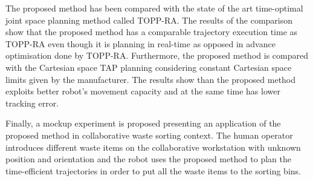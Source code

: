 The proposed method has been compared with the state of the art time-optimal joint space planning method called TOPP-RA. The results of the comparison show that the proposed method has a comparable trajectory execution time as TOPP-RA even though it is planning in real-time as opposed in advance optimisation done by TOPP-RA.
Furthermore, the proposed method is compared with the Cartesian space TAP planning considering constant Cartesian space limits given by the manufacturer. The results show than the proposed method exploits better robot's movement capacity and at the same time has lower tracking error. 

Finally, a mockup experiment is proposed presenting an application of the proposed method in collaborative waste sorting context. The human operator introduces different waste items on the collaborative workstation with unknown position and orientation and the robot uses the proposed method to plan the time-efficient trajectories in order to put all the waste items to the sorting bins.

